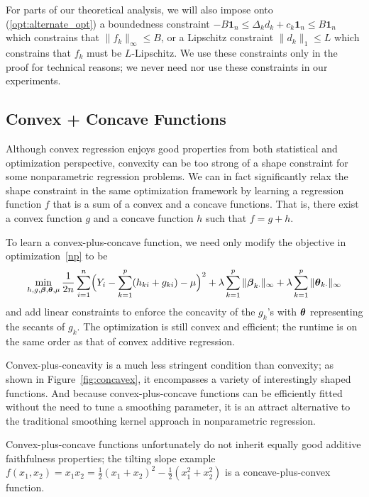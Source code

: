 \begin{remark}
\label{rem:bounded_lipschitz_constraints}
For parts of our theoretical analysis, we will also impose onto (\ref{opt:alternate_opt}) a boundedness constraint $-B \mathbf{1}_n \leq \Delta_k d_k + c_k \mathbf{1}_n \leq B \mathbf{1}_n$ which constrains that $\|f_k \|_\infty \leq B$, or a Lipschitz constraint $\|d_k\|_1 \leq L$ which constrains that $f_k$ must be $L$-Lipschitz. We use these constraints only in the proof for technical reasons; we never need nor use these constraints in our experiments.
\end{remark}


\subsection{Convex + Concave Functions}

Although convex regression enjoys good properties from both statistical and optimization perspective, convexity can be too strong of a shape constraint for some nonparametric regression problems. We can in fact significantly relax the shape constraint in the same optimization framework by learning a regression function $f$ that is a sum of a convex and a concave functions. That is, there exist a convex function $g$ and a concave function $h$ such that $f = g + h$. 

To learn a convex-plus-concave function, we need only modify the objective in optimization~\ref{np} to be
\[
\min_{h, g, \boldsymbol{\beta}, \boldsymbol{\theta}, \mu} 
   \frac{1}{2n}\sum_{i=1}^{n}
                     \Bigl( Y_{i}-\sum_{k=1}^{p} (h_{ki} + g_{ki}) - \mu \Bigr)^{2} 
                         + \lambda\sum_{k=1}^{p}\|\boldsymbol{\beta}_{k\cdot}\|_{\infty} 
                         + \lambda\sum_{k=1}^{p}\|\boldsymbol{\theta}_{k\cdot}\|_{\infty}
\]
and add linear constraints to enforce the concavity of the $g_k$'s with $\boldsymbol{\theta}$ representing the secants of $g_k$. The optimization is still convex and efficient; the runtime is on the same order as that of convex additive regression. 

Convex-plus-concavity is a much less stringent condition than convexity; as shown in Figure~\ref{fig:concavex}, it encompasses a variety of interestingly shaped functions. And because convex-plus-concave functions can be efficiently fitted without the need to tune a smoothing parameter, it is an attract alternative to the traditional smoothing kernel approach in nonparametric regression.

Convex-plus-concave functions unfortunately do not inherit equally good additive faithfulness properties; the tilting slope example $f(x_1, x_2) = x_1 x_2 = \frac{1}{2}(x_1 + x_2)^2 - \frac{1}{2}(x_1^2 + x_2^2)$ is a concave-plus-convex function. 

